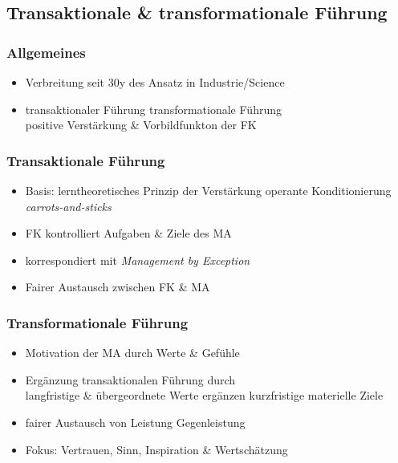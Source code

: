 \documentclass{cheatsheet}
\begin{document}
    \subsection{Transaktionale \& transformationale Führung}
    \begin{normbox}{\subsubsection{Allgemeines}}
        \begin{itemize}
            \item Verbreitung seit 30y des Ansatz in Industrie/Science
            \item transaktionaler Führung \ra transformationale Führung\\
            \ra positive Verstärkung \& Vorbildfunkton der FK
        \end{itemize}
    \end{normbox}
    \begin{normbox}{\subsubsection{Transaktionale Führung}}
        \begin{itemize}
            \item Basis: lerntheoretisches Prinzip der Verstärkung
            \ra operante Konditionierung \rightleftharpoons \emph{carrots-and-sticks}
            \item FK kontrolliert Aufgaben \& Ziele des MA
            \item korrespondiert mit \emph{Management by Exception}
            \item Fairer Austausch zwischen FK \& MA
        \end{itemize}
    \end{normbox}
    \begin{normbox}{\subsubsection{Transformationale Führung}}
        \begin{itemize}
            \item Motivation der MA durch Werte \& Gefühle
            \item Ergänzung transaktionalen Führung durch\\
            \ra langfristige \& übergeordnete Werte ergänzen kurzfristige materielle Ziele
            \item fairer Austausch von Leistung \rightleftharpoons Gegenleistung
            \item Fokus: Vertrauen, Sinn, Inspiration \& Wertschätzung
        \end{itemize}
    \end{normbox}
\end{document}
